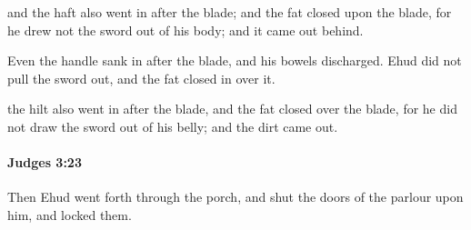 			\begin{versebox}
					\item[BHS] 
					\item[ASV] and the haft also went in after the blade; and the fat closed upon the blade, for he drew not the sword out of his body; and it came out behind.
					\item[NIV] Even the handle sank in after the blade, and his bowels discharged. Ehud did not pull the sword out, and the fat closed in over it.
					\item[NRSV] the hilt also went in after the blade, and the fat closed over the blade, for he did not draw the sword out of his belly; and the dirt came out.
			\end{versebox}

		\paragraph{Judges 3:23} %
			\label{JUDGES-3-23}

			Then Ehud went forth through the porch, and shut the doors of the parlour upon him, and locked them.

